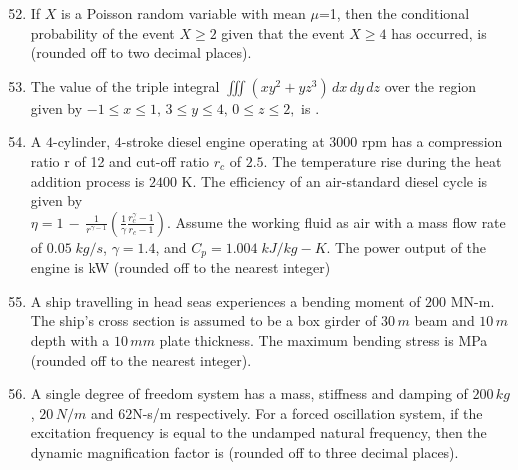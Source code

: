 \documentclass[journal]{IEEEtran}
\theoremstyle{remark}
\begin{document}
\begin{enumerate}[itemsep=1em]
\setcounter{enumi}{51}
\item If $X$ is a Poisson random variable with mean $\mu$=1, then the conditional probability of the event ${X\geq 2}$ given that the event ${X\geq 4}$ has occurred, is
\underline{\hspace{2cm}} (rounded off to two decimal places). 
\end{enumerate}

\begin{enumerate}[itemsep=1em]
\setcounter{enumi}{52}
\item The value of the triple integral $\iiint(xy^2+yz^3)\,dx\,dy\,dz$ over the region given by $-1\leq x\leq 1,\,3\leq y \leq 4,\,0 \leq z \leq 2,$ is \underline{\hspace{2cm}}.
\end{enumerate}

\begin{enumerate}[itemsep=1em]
\setcounter{enumi}{53}
\item A $4$-cylinder, $4$-stroke diesel engine operating at 3000 rpm has a compression ratio r of 12 and cut-off ratio $r_c$ of $2.5$. The temperature rise during the heat addition process is $2400$ K. The efficiency of an air-standard diesel cycle is given by \\$\eta=1\,-\,\frac{1}{r^{\gamma-1}}(\frac{1}{\gamma}\frac{r_c^\gamma-1}{r_c-1})$. Assume the working fluid as air with a mass flow rate of 
$0.05\;kg/s$, $\gamma=1.4$, and $C_p=1.004\;kJ/kg-K$.
The power output of the engine is \underline{\hspace{1cm}}kW (rounded off to the nearest integer)
\end{enumerate}

\begin{enumerate}[itemsep=1em]
\setcounter{enumi}{54}
\item A ship travelling in head seas experiences a bending moment of $200$ MN-m. The ship's cross section is assumed to be a box girder of $30\,m$ beam and $10\,m$ depth with a $10\,mm$ plate thickness. The maximum bending stress is \underline{\hspace{2cm}} MPa 
(rounded off to the nearest integer).
\end{enumerate}

\begin{enumerate}[itemsep=1em]
\setcounter{enumi}{55}
\item A single degree of freedom system has a mass, stiffness and damping of $200\,kg$, $20\,N/m$ and $62$N-s/m respectively. For a forced oscillation system, if the excitation frequency is equal to the undamped natural frequency, then the dynamic 
magnification factor is \underline{\hspace{2cm}} (rounded off to three decimal places). 
\end{enumerate}
\end{document}

